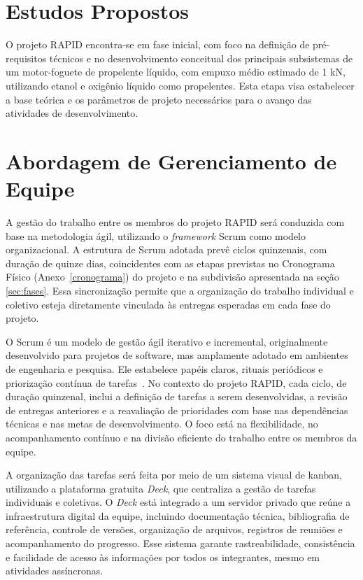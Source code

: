 \section{Estudos Propostos}\label{sec:estudos}
O projeto \Gls{RAPID} encontra-se em fase inicial, com foco na definição de pré-requisitos técnicos e no desenvolvimento conceitual dos principais subsistemas de um motor-foguete de propelente líquido, com empuxo médio estimado de 1 kN, utilizando etanol e oxigênio líquido como propelentes. Esta etapa visa estabelecer a base teórica e os parâmetros de projeto necessários para o avanço das atividades de desenvolvimento.

\section{Abordagem de Gerenciamento de Equipe}\label{sec:geren}
A gestão do trabalho entre os membros do projeto \Gls{RAPID} será conduzida com base na metodologia ágil, utilizando o \textit{framework} Scrum como modelo organizacional. A estrutura de Scrum adotada prevê ciclos quinzenais, com duração de quinze dias, coincidentes com as etapas previstas no Cronograma Físico (Anexo~\ref{cronograma}) do projeto e na subdivisão apresentada na seção \ref{sec:fases}. Essa sincronização permite que a organização do trabalho individual e coletivo esteja diretamente vinculada às entregas esperadas em cada fase do projeto.

O Scrum é um modelo de gestão ágil iterativo e incremental, originalmente desenvolvido para projetos de software, mas amplamente adotado em ambientes de engenharia e pesquisa. Ele estabelece papéis claros, rituais periódicos e priorização contínua de tarefas~\cite{Bott2020}. No contexto do projeto \Gls{RAPID}, cada ciclo, de duração quinzenal, inclui a definição de tarefas a serem desenvolvidas, a revisão de entregas anteriores e a reavaliação de prioridades com base nas dependências técnicas e nas metas de desenvolvimento. O foco está na flexibilidade, no acompanhamento contínuo e na divisão eficiente do trabalho entre os membros da equipe.

A organização das tarefas será feita por meio de um sistema visual de kanban, utilizando a plataforma gratuita \textit{Deck}, que centraliza a gestão de tarefas individuais e coletivas. O \textit{Deck} está integrado a um servidor privado que reúne a infraestrutura digital da equipe, incluindo documentação técnica, bibliografia de referência, controle de versões, organização de arquivos, registros de reuniões e acompanhamento do progresso. Esse sistema garante rastreabilidade, consistência e facilidade de acesso às informações por todos os integrantes, mesmo em atividades assíncronas.

